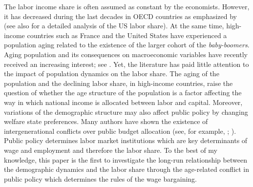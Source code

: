 

The labor income share is often assumed as constant by the economists. However, it has decreased during the last decades in OECD countries as emphasized by \cite{Karabarbounis2014} (see also \citealt{Elsby2013} for a detailed analysis of the US labor share).
At the same time, high-income countries such as France and the United States have experienced a population aging related to the existence of the larger cohort of the \textit{baby-boomers}. Aging population and its consequences on macroeconomic variables have recently received an increasing interest; see \cite{Sheiner2014}.
Yet, the literature has paid little attention to the impact of population dynamics on the labor share. The aging of the population and the declining labor share, in high-income countries, raise the question of whether the age structure of the population is a factor affecting the way in which national income is allocated between labor and capital.
Moreover, variations of the demographic structure may also affect public policy by changing welfare state preferences. Many authors have shown the existence of intergenerational conflicts over public budget allocation (see, for example, \citealt{Busemeyer2009}; \citealt{Sorensen2013}). Public policy determines labor market institutions which are key determinants of wage and employment and therefore the labor share.
To the best of my knowledge, this paper is the first to investigate the long-run relationship between the demographic dynamics and the labor share through the age-related conflict in public policy which determines the rules of the wage bargaining.


